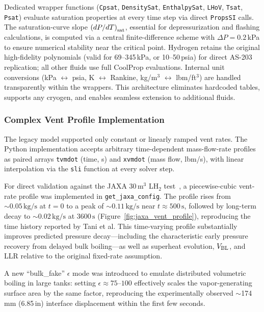 \documentclass[conf]{new-aiaa}
\begin{document}
Dedicated wrapper functions (\texttt{Cpsat}, \texttt{DensitySat}, \texttt{EnthalpySat}, \texttt{LHoV}, \texttt{Tsat}, \texttt{Psat}) evaluate saturation properties at every time step via direct \texttt{PropsSI} calls. The saturation-curve slope $\left(dP/dT\right)_{\rm sat}$, essential for depressurization and flashing calculations, is computed via a central finite-difference scheme with $\Delta P = 0.2\,$kPa to ensure numerical stability near the critical point. Hydrogen retains the original high-fidelity polynomials (valid for 69--345\,kPa, or 10--50\,psia) for direct AS-203 replication; all other fluids use full CoolProp evaluations. Internal unit conversions (kPa $\leftrightarrow$ psia, K $\leftrightarrow$ Rankine, kg/m$^3$ $\leftrightarrow$ lbm/ft$^3$) are handled transparently within the wrappers. This architecture eliminates hardcoded tables, supports any cryogen, and enables seamless extension to additional fluids.

\subsubsection{Complex Vent Profile Implementation}
The legacy model supported only constant or linearly ramped vent rates. The Python implementation accepts arbitrary time-dependent mass-flow-rate profiles as paired arrays \texttt{tvmdot} (time, s) and \texttt{xvmdot} (mass flow, lbm/s), with linear interpolation via the \texttt{sli} function at every solver step.

For direct validation against the JAXA $30\,\text{m}^3$ LH$_2$ test~\cite{tani2021pressure}, a piecewise-cubic vent-rate profile was implemented in \texttt{get\_jaxa\_config}. The profile rises from $\sim 0.05\,\text{kg/s}$ at $t = 0$ to a peak of $\sim 0.11\,\text{kg/s}$ near $t \approx 500\,\text{s}$, followed by long-term decay to $\sim 0.02\,\text{kg/s}$ at $3600\,\text{s}$ (Figure~\ref{fig:jaxa_vent_profile}), reproducing the time history reported by Tani et al. This time-varying profile substantially improves predicted pressure decay---including the characteristic early pressure recovery from delayed bulk boiling---as well as superheat evolution, $V_{\rm BL}$, and LLR relative to the original fixed-rate assumption.

A new ``bulk\_fake'' $\epsilon$ mode was introduced to emulate distributed volumetric boiling in large tanks: setting $\epsilon \approx 75$--$100$ effectively scales the vapor-generating surface area by the same factor, reproducing the experimentally observed $\sim$174\,mm (6.85\,in) interface displacement within the first few seconds.
\end{document}
